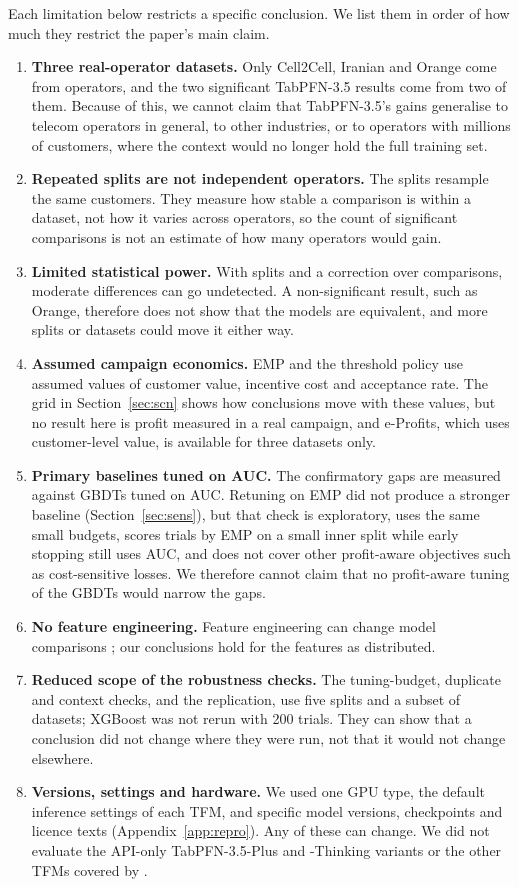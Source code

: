 \documentclass[11pt]{article}
\newcommand{\tfm}{TFM\xspace}
\newcommand{\tfms}{TFMs\xspace}
\begin{document}
Each limitation below restricts a specific conclusion. We list them in order of how much they restrict the paper's
main claim.

\begin{enumerate}
\item \textbf{Three real-operator datasets.} Only Cell2Cell, Iranian and Orange come from operators, and the two
  significant TabPFN-3.5 results come from two of them. Because of this, we cannot claim that TabPFN-3.5's gains
  generalise to telecom operators in general, to other industries, or to operators with millions of customers, where
  the context would no longer hold the full training set.
\item \textbf{Repeated splits are not independent operators.} The \nSeeds{} splits resample the same customers. They
  measure how stable a comparison is within a dataset, not how it varies across operators, so the count of
  significant comparisons is not an estimate of how many operators would gain.
\item \textbf{Limited statistical power.} With \nSeeds{} splits and a correction over \nPrimary{} comparisons, moderate
  differences can go undetected. A non-significant result, such as Orange, therefore does not show that the models
  are equivalent, and more splits or datasets could move it either way.
\item \textbf{Assumed campaign economics.} EMP and the threshold policy use assumed values of customer value, incentive
  cost and acceptance rate. The grid in Section~\ref{sec:scn} shows how conclusions move with these values, but no
  result here is profit measured in a real campaign, and e-Profits, which uses customer-level value, is available for
  three datasets only.
\item \textbf{Primary baselines tuned on AUC.} The confirmatory gaps are measured against GBDTs tuned on AUC. Retuning
  on EMP did not produce a stronger baseline (Section~\ref{sec:sens}), but that check is exploratory, uses the same
  small budgets, scores trials by EMP on a small inner split while early stopping still uses AUC, and does not cover
  other profit-aware objectives such as cost-sensitive losses. We therefore cannot claim that no profit-aware tuning
  of the GBDTs would narrow the gaps.
\item \textbf{No feature engineering.} Feature engineering can change model comparisons \cite{tschalzev2026tabprep};
  our conclusions hold for the features as distributed.
\item \textbf{Reduced scope of the robustness checks.} The tuning-budget, duplicate and context checks, and the
  replication, use five splits and a subset of datasets; XGBoost was not rerun with 200 trials. They can show that a
  conclusion did not change where they were run, not that it would not change elsewhere.
\item \textbf{Versions, settings and hardware.} We used one GPU type, the default inference settings of each \tfm, and
  specific model versions, checkpoints and licence texts (Appendix~\ref{app:repro}). Any of these can change. We did
  not evaluate the API-only TabPFN-3.5-Plus and -Thinking variants or the other \tfms covered by
  \cite{seyedzadeh2026churn}.
\end{enumerate}
\end{document}
